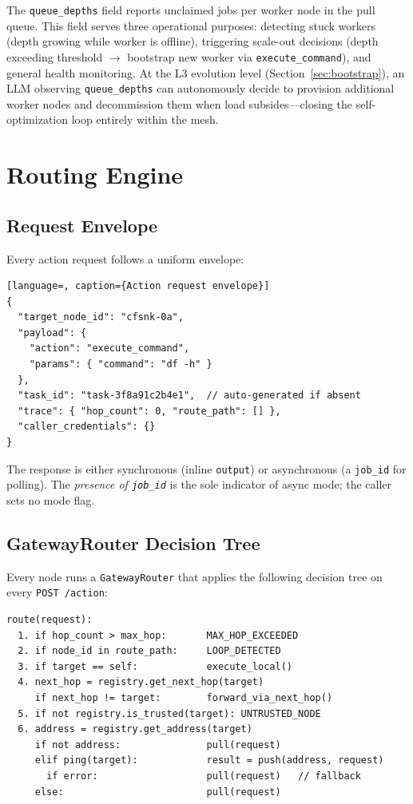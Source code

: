 \documentclass[10pt,twocolumn]{article}
\begin{document}
The \texttt{queue\_depths} field reports unclaimed jobs per worker
node in the pull queue. This field serves three operational purposes:
detecting stuck workers (depth growing while worker is offline),
triggering scale-out decisions (depth exceeding threshold $\to$
bootstrap new worker via \texttt{execute\_command}), and general
health monitoring. At the L3 evolution level
(Section~\ref{sec:bootstrap}), an LLM observing
\texttt{queue\_depths} can autonomously decide to provision additional
worker nodes and decommission them when load subsides---closing the
self-optimization loop entirely within the mesh.

\section{Routing Engine}
\label{sec:routing}

\subsection{Request Envelope}

Every action request follows a uniform envelope:

\begin{lstlisting}[language=, caption={Action request envelope}]
{
  "target_node_id": "cfsnk-0a",
  "payload": {
    "action": "execute_command",
    "params": { "command": "df -h" }
  },
  "task_id": "task-3f8a91c2b4e1",  // auto-generated if absent
  "trace": { "hop_count": 0, "route_path": [] },
  "caller_credentials": {}
}
\end{lstlisting}

The response is either synchronous (inline \texttt{output}) or
asynchronous (a \texttt{job\_id} for polling). The \emph{presence of
\texttt{job\_id}} is the sole indicator of async mode; the caller sets
no mode flag.

\subsection{GatewayRouter Decision Tree}

Every node runs a \texttt{GatewayRouter} that applies the following
decision tree on every \texttt{POST /action}:

\begin{lstlisting}[caption={Routing decision logic (pseudocode)}]
route(request):
  1. if hop_count > max_hop:       MAX_HOP_EXCEEDED
  2. if node_id in route_path:     LOOP_DETECTED
  3. if target == self:            execute_local()
  4. next_hop = registry.get_next_hop(target)
     if next_hop != target:        forward_via_next_hop()
  5. if not registry.is_trusted(target): UNTRUSTED_NODE
  6. address = registry.get_address(target)
     if not address:               pull(request)
     elif ping(target):            result = push(address, request)
       if error:                   pull(request)   // fallback
     else:                         pull(request)
\end{lstlisting}
\end{document}
